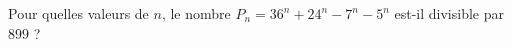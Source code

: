 Pour quelles valeurs de $n$, le nombre $P_n = 36^n + 24^n - 7^n - 5^n$ est-il divisible par $899$ ?
